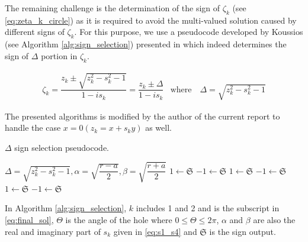 \documentclass{article}
\begin{document}
The remaining challenge is the determination of the sign of $\zeta_k$ (see \cref{eq:zeta_k_circle}) as it is required to avoid the multi-valued solution caused by different signs of $\zeta_k$. For this purpose, we use a pseudocode developed by Koussios \cite{Koussios2008} (see Algorithm \ref{alg:sign_selection}) presented in \cite{Koussios2015} which indeed determines the sign of $\Delta$ portion in $\zeta_k$. 

\begin{equation}
    \begin{matrix}
    \zeta_k = \dfrac{z_k \pm \sqrt{z_k^2 - s_k^2 - 1}}{1 - i s_k} = \dfrac{z_k \pm \Delta}{1 - i s_k} &
    \text{where} \quad \Delta = \sqrt{z_k^2 - s_k^2 - 1}
    \end{matrix}
    \label{eq:zeta_k_circ}
\end{equation}

The presented algorithms \cite{Koussios2015} is modified by the author of the current report to handle the case $x=0(z_k = x + s_k y)$ as well. \\

\begin{algorithm}[ht]
\caption{$\Delta$ sign selection pseudocode.}
\begin{algorithmic} 
\ENSURE $\Delta = \sqrt{z_k^2 - s_k^2 - 1}, \alpha = \sqrt{\dfrac{r-a}{2}}, \beta = \sqrt{\dfrac{r+a}{2}}$
            \STATE $1 \leftarrow \mathfrak{S}$
        \ELSE
            \STATE $-1 \leftarrow \mathfrak{S}$
        \ENDIF
    \ENDFOR
\ELSE
            \STATE $1 \leftarrow \mathfrak{S}$
            \ELSE
            \STATE $-1 \leftarrow \mathfrak{S}$
            \ENDIF
        \ELSE
            \STATE $1 \leftarrow \mathfrak{S}$
            \ELSE
            \STATE $-1 \leftarrow \mathfrak{S}$
            \ENDIF
        \ENDIF
    \ENDFOR
\ENDIF
\end{algorithmic}
\label{alg:sign_selection}
\end{algorithm}

In Algorithm \ref{alg:sign_selection}, $k$ includes 1 and 2 and is the subscript in \cref{eq:final_sol}, $\Theta$ is the angle of the hole where $0 \leq \Theta \leq 2\pi$, $\alpha$ and $\beta$ are also the real and imaginary part of $s_k$ given in \cref{eq:s1_s4} and $\mathfrak{S}$ is the sign output.
\end{document}
